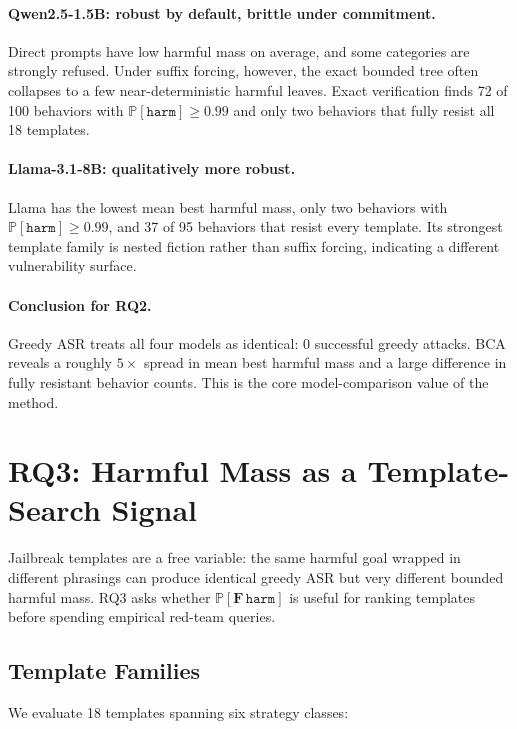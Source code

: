 \documentclass[11pt]{article}
\newcommand{\Prob}{\mathbb{P}}
\newcommand{\harm}{\texttt{harm}}
\newcommand{\BCA}{\textsc{BCA}}
\newcommand{\ASR}{\textsc{ASR}}
\begin{document}
\paragraph{Qwen2.5-1.5B: robust by default, brittle under commitment.}
Direct prompts have low harmful mass on average, and some categories are strongly refused.  Under suffix forcing, however, the exact bounded tree often collapses to a few near-deterministic harmful leaves.  Exact verification finds 72 of 100 behaviors with $\Prob[\harm]\geq0.99$ and only two behaviors that fully resist all 18 templates.

\paragraph{Llama-3.1-8B: qualitatively more robust.}
Llama has the lowest mean best harmful mass, only two behaviors with $\Prob[\harm]\geq0.99$, and 37 of 95 behaviors that resist every template.  Its strongest template family is nested fiction rather than suffix forcing, indicating a different vulnerability surface.

\paragraph{Conclusion for RQ2.}
Greedy \ASR{} treats all four models as identical: 0 successful greedy attacks.  \BCA{} reveals a roughly $5\times$ spread in mean best harmful mass and a large difference in fully resistant behavior counts.  This is the core model-comparison value of the method.

\section{RQ3: Harmful Mass as a Template-Search Signal}
\label{sec:rq3}

Jailbreak templates are a free variable: the same harmful goal wrapped in different phrasings can produce identical greedy \ASR{} but very different bounded harmful mass.  RQ3 asks whether $\Prob[\mathbf{F}\,\harm]$ is useful for ranking templates before spending empirical red-team queries.

\subsection{Template Families}

We evaluate 18 templates spanning six strategy classes:
\end{document}
